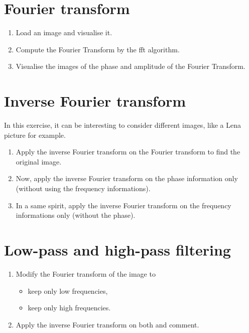 \section{Fourier transform}

\begin{qbox}
\begin{enumerate}
	\item Load an image and visualise it.
	\item Compute the Fourier Transform by the fft algorithm.
	\item Visualise the images of the phase and amplitude of the Fourier Transform.
\end{enumerate}
\end{qbox}

\section{Inverse Fourier transform}
In this exercise, it can be interesting to consider different images, like a Lena picture for example.

\begin{qbox}
\begin{enumerate}
 \item Apply the inverse Fourier transform on the Fourier transform to find the original image.
 \item Now, apply the inverse Fourier transform on the phase information only (without using the frequency informations).
 \item In a same spirit, apply the inverse Fourier transform on the frequency informations only (without the phase).
\end{enumerate}
\end{qbox}

\section{Low-pass and high-pass filtering}
\begin{qbox}
\begin{enumerate}
	\item Modify the Fourier transform of the image to 
	\begin{itemize}\item keep only low frequencies,
	 \item keep only high frequencies.
	\end{itemize}
 
	\item Apply the inverse Fourier transform on both and comment. 
\end{enumerate}
\end{qbox}


